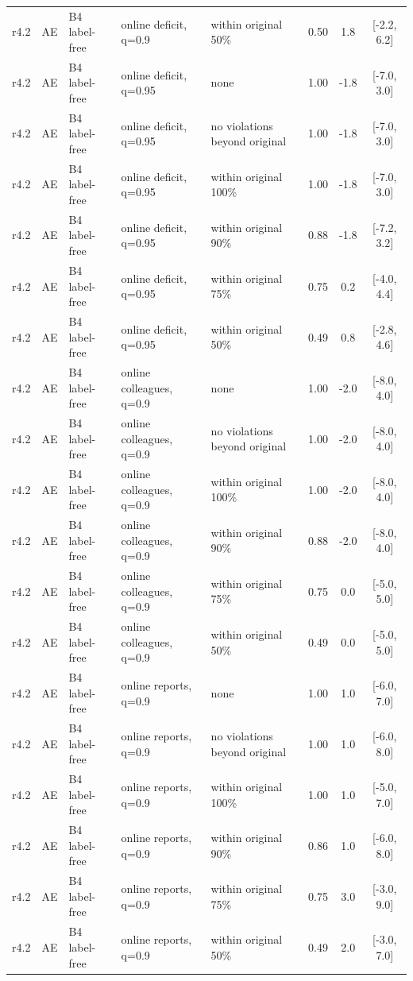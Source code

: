 \begin{longtable}{lllp{4.2cm}p{3.4cm}ccc}
r4.2 & AE & B4 label-free & online deficit, q=0.9 & within original 50\% & 0.50 & 1.8 & [-2.2, 6.2] \\
r4.2 & AE & B4 label-free & online deficit, q=0.95 & none & 1.00 & -1.8 & [-7.0, 3.0] \\
r4.2 & AE & B4 label-free & online deficit, q=0.95 & no violations beyond original & 1.00 & -1.8 & [-7.0, 3.0] \\
r4.2 & AE & B4 label-free & online deficit, q=0.95 & within original 100\% & 1.00 & -1.8 & [-7.0, 3.0] \\
r4.2 & AE & B4 label-free & online deficit, q=0.95 & within original 90\% & 0.88 & -1.8 & [-7.2, 3.2] \\
r4.2 & AE & B4 label-free & online deficit, q=0.95 & within original 75\% & 0.75 & 0.2 & [-4.0, 4.4] \\
r4.2 & AE & B4 label-free & online deficit, q=0.95 & within original 50\% & 0.49 & 0.8 & [-2.8, 4.6] \\
r4.2 & AE & B4 label-free & online colleagues, q=0.9 & none & 1.00 & -2.0 & [-8.0, 4.0] \\
r4.2 & AE & B4 label-free & online colleagues, q=0.9 & no violations beyond original & 1.00 & -2.0 & [-8.0, 4.0] \\
r4.2 & AE & B4 label-free & online colleagues, q=0.9 & within original 100\% & 1.00 & -2.0 & [-8.0, 4.0] \\
r4.2 & AE & B4 label-free & online colleagues, q=0.9 & within original 90\% & 0.88 & -2.0 & [-8.0, 4.0] \\
r4.2 & AE & B4 label-free & online colleagues, q=0.9 & within original 75\% & 0.75 & 0.0 & [-5.0, 5.0] \\
r4.2 & AE & B4 label-free & online colleagues, q=0.9 & within original 50\% & 0.49 & 0.0 & [-5.0, 5.0] \\
r4.2 & AE & B4 label-free & online reports, q=0.9 & none & 1.00 & 1.0 & [-6.0, 7.0] \\
r4.2 & AE & B4 label-free & online reports, q=0.9 & no violations beyond original & 1.00 & 1.0 & [-6.0, 8.0] \\
r4.2 & AE & B4 label-free & online reports, q=0.9 & within original 100\% & 1.00 & 1.0 & [-5.0, 7.0] \\
r4.2 & AE & B4 label-free & online reports, q=0.9 & within original 90\% & 0.86 & 1.0 & [-6.0, 8.0] \\
r4.2 & AE & B4 label-free & online reports, q=0.9 & within original 75\% & 0.75 & 3.0 & [-3.0, 9.0] \\
r4.2 & AE & B4 label-free & online reports, q=0.9 & within original 50\% & 0.49 & 2.0 & [-3.0, 7.0] \\

\end{longtable}
